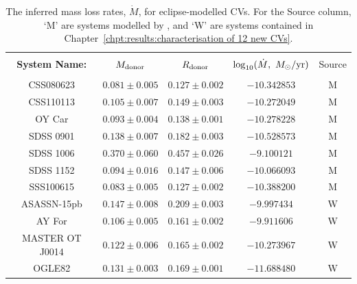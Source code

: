 \begin{table}
    \centering
    \caption{The inferred mass loss rates, $\dot M$, for eclipse-modelled CVs. For the Source column, `M' are systems modelled by \citet{McAllister2019}, and `W' are systems contained in Chapter~\ref{chpt:results:characterisation of 12 new CVs}.}
    \label{table:results:mdot modelling}
    \begin{tabular}{ccccc}
        \hline \\
        {\bf System Name:}  & \textbf{$M_{\rm donor}$}  & \textbf{$R_{\rm donor}$}  & \textbf{$\log_{10}(\dot M,\ M_\odot / {\rm yr})$} & Source\\
        \hline \hline \\
        CSS080623           & $0.081\pm0.005$           & $0.127\pm0.002$           & $ -10.342853$                                     & M \\
        CSS110113           & $0.105\pm0.007$           & $0.149\pm0.003$           & $ -10.272049$                                     & M \\
        OY Car              & $0.093\pm0.004$           & $0.138\pm0.001$           & $ -10.278228$                                     & M \\
        SDSS 0901           & $0.138\pm0.007$           & $0.182\pm0.003$           & $ -10.528573$                                     & M \\
        SDSS 1006           & $0.370\pm0.060$           & $0.457\pm0.026$           & $  -9.100121$                                     & M \\
        SDSS 1152           & $0.094\pm0.016$           & $0.147\pm0.006$           & $ -10.066093$                                     & M \\
        SSS100615           & $0.083\pm0.005$           & $0.127\pm0.002$           & $ -10.388200$                                     & M \\
        ASASSN-15pb         & $0.147\pm0.008$           & $0.209\pm0.003$           & $  -9.997434$                                     & W \\
        AY For              & $0.106\pm0.005$           & $0.161\pm0.002$           & $  -9.911606$                                     & W \\
        MASTER OT J0014     & $0.122\pm0.006$           & $0.165\pm0.002$           & $ -10.273967$                                     & W \\
        OGLE82              & $0.131\pm0.003$           & $0.169\pm0.001$           & $ -11.688480$                                     & W \\

\end{tabular}
\end{table}
